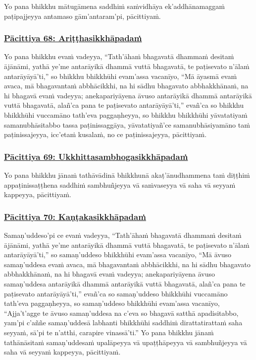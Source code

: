 Yo pana bhikkhu mātugāmena saddhiṁ saṁvidhāya ek'addhānamaggaṁ paṭipajjeyya antamaso gām'antaram'pi, pācittiyaṁ.



\subsubsection*{\hyperref[exp68]{Pācittiya 68: Ariṭṭhasikkhāpadaṁ}}
\label{pac68}

Yo pana bhikkhu evaṁ vadeyya, ``Tath'āhaṁ bhagavatā dhammaṁ desitaṁ ājānāmi, yathā ye'me antarāyikā dhammā vuttā bhagavatā, te paṭisevato n'ālaṁ antarāyāyā'ti,'' so bhikkhu bhikkhūhi evam'assa vacanīyo, ``Mā āyasmā evaṁ avaca, mā bhagavantaṁ abbhācikkhi, na hi sādhu bhagavato abbhakkhānaṁ, na hi bhagavā evaṁ vadeyya; anekapariyāyena āvuso antarāyikā dhammā antarāyikā vuttā bhagavatā, alañ'ca pana te paṭisevato antarāyāyā'ti,'' evañ'ca so bhikkhu bhikkhūhi vuccamāno tath'eva paggaṇheyya, so bhikkhu bhikkhūhi yāvatatiyaṁ samanubhāsitabbo tassa paṭinissaggāya, yāvatatiyañ'ce samanubhāsiyamāno taṁ paṭinissajeyya, icc'etaṁ kusalaṁ, no ce paṭinissajeyya, pācittiyaṁ.



\subsubsection*{\hyperref[exp69]{Pācittiya 69: Ukkhittasambhogasikkhāpadaṁ}}
\label{pac69}

Yo pana bhikkhu jānaṁ tathāvādinā bhikkhunā akaṭ'ānudhammena taṁ diṭṭhiṁ appaṭinissaṭṭhena saddhiṁ sambhuñjeyya vā saṁvaseyya vā saha vā seyyaṁ kappeyya, pācittiyaṁ.



\subsubsection*{\hyperref[exp70]{Pācittiya 70: Kaṇṭakasikkhāpadaṁ}}
\label{pac70}

Samaṇ'uddeso'pi ce evaṁ vadeyya, ``Tath'āhaṁ bhagavatā dhammaṁ desitaṁ ājānāmi, yathā ye'me antarāyikā dhammā vuttā bhagavatā, te paṭisevato n'ālaṁ antarāyāyā'ti,'' so samaṇ'uddeso bhikkhūhi evam'assa vacanīyo, ``Mā āvuso samaṇ'uddesa evaṁ avaca, mā bhagavantaṁ abbhācikkhi, na hi sādhu bhagavato abbhakkhānaṁ, na hi bhagavā evaṁ vadeyya; anekapariyāyena āvuso samaṇ'uddesa antarāyikā dhammā antarāyikā vuttā bhagavatā, alañ'ca pana te paṭisevato antarāyāyā'ti,'' evañ'ca so samaṇ'uddeso bhikkhūhi vuccamāno tath'eva paggaṇheyya, so samaṇ'uddeso bhikkhūhi evam'assa vacanīyo, ``Ajja't'agge te āvuso samaṇ'uddesa na c'eva so bhagavā satthā apadisitabbo, yam'pi c'aññe samaṇ'uddesā labhanti bhikkhūhi saddhiṁ dirattatirattaṁ saha seyyaṁ, sā'pi te n'atthi, carapire vinassā'ti.'' Yo pana bhikkhu jānaṁ tathānāsitaṁ samaṇ'uddesaṁ upalāpeyya vā upaṭṭhāpeyya vā sambhuñjeyya vā saha vā seyyaṁ kappeyya, pācittiyaṁ.

